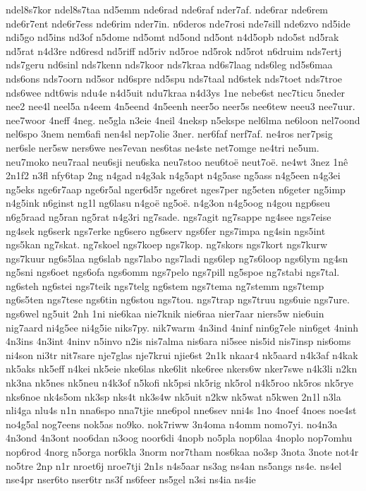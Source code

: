 {ndel8s7kor
ndel8s7taa
nd5emm
nde6rad
nde6raf
nder7af.
nde6rar
nde6rem
nde6r7ent
nde6r7ess
nde6rim
nder7in.
n6deros
nde7rosi
nde7sill
nde6zvo
nd5ide
ndi5go
nd5ins
nd3of
n5dome
nd5omt
nd5ond
nd5ont
n4d5opb
ndo5st
nd5rak
nd5rat
n4d3re
nd6resd
nd5riff
nd5riv
nd5roe
nd5rok
nd5rot
n6druim
nds7ertj
nds7geru
nd6sinl
nds7kenn
nds7koor
nds7kraa
nd6s7laag
nds6leg
nd5s6maa
nds6ons
nds7oorn
nd5sor
nd6spre
nd5spu
nds7taal
nd6stek
nds7toet
nds7troe
nds6wee
ndt6wis
ndu4e
n4d5uit
ndu7kraa
n4d3ys
1ne
nebe6st
nec7ticu
5neder
nee2
nee4l
neel5a
n4eem
4n5eend
4n5eenh
neer5o
neer5s
nee6tew
neeu3
nee7uur.
nee7woor
4neff
4neg.
ne5gla
n3eie
4neil
4neksp
n5ekspe
nel6lma
ne6loon
nel7oond
nel6spo
3nem
nem6afi
nen4sl
nep7olie
3ner.
ner6faf
nerf7af.
ne4ros
ner7psig
ner6sle
ner5sw
ners6we
nes7evan
nes6tas
ne4ste
net7omge
ne4tri
ne5um.
neu7moko
neu7raal
neu6sji
neu6ska
neu7stoo
neu6toë
neut7oë.
ne4wt
3nez
1nê
2n1f2
n3fl
nfy6tap
2ng
n4gad
n4g3ak
n4g5apt
n4g5ase
ng5ass
n4g5een
n4g3ei
ng5eks
nge6r7aap
nge6r5al
nger6d5r
nge6ret
nges7per
ng5eten
n6geter
ng5imp
n4g5ink
n6ginst
ng1l
ng6lasu
n4goë
ng5oë.
n4g3on
n4g5oog
n4gou
ngp6seu
n6g5raad
ng5ran
ng5rat
n4g3ri
ng7sade.
ngs7agit
ng7sappe
ng4see
ngs7eise
ng4sek
ng6serk
ngs7erke
ng6sero
ng6serv
ngs6fer
ngs7impa
ng4sin
ngs5int
ngs5kan
ng7skat.
ng7skoel
ngs7koep
ngs7kop.
ng7skors
ngs7kort
ngs7kurw
ngs7kuur
ng6s5laa
ng6slab
ngs7labo
ngs7ladi
ngs6lep
ng7s6loop
ngs6lym
ng4sn
ng5sni
ngs6oet
ngs6ofa
ngs6omm
ngs7pelo
ngs7pill
ng5spoe
ng7stabi
ngs7tal.
ng6steh
ng6stei
ngs7teik
ngs7telg
ng6stem
ngs7tema
ng7stemm
ngs7temp
ng6s5ten
ngs7tese
ngs6tin
ng6stou
ngs7tou.
ngs7trap
ngs7truu
ngs6uie
ngs7ure.
ngs6wel
ng5uit
2nh
1ni
nie6kaa
nie7knik
nie6raa
nier7aar
niers5w
nie6uin
nig7aard
ni4g5ee
ni4g5ie
niks7py.
nik7warm
4n3ind
4ninf
nin6g7ele
nin6get
4ninh
4n3ins
4n3int
4ninv
n5invo
n2is
nis7alma
nis6ara
ni5see
nis5id
nis7insp
nis6oms
ni4son
ni3tr
nit7sare
nje7glas
nje7krui
njie6st
2n1k
nkaar4
nk5aard
n4k3af
n4kak
nk5aks
nk5eff
n4kei
nk5eie
nke6las
nke6lit
nke6ree
nkers6w
nker7swe
n4k3li
n2kn
nk3na
nk5nes
nk5neu
n4k3of
n5kofi
nk5psi
nk5rig
nk5rol
n4k5roo
nk5ros
nk5rye
nks6noe
nk4s5om
nk3sp
nks4t
nk3s4w
nk5uit
n2kw
nk5wat
n5kwen
2n1l
n3la
nli4ga
nlu4s
n1n
nna6spo
nna7tjie
nne6pol
nne6sev
nni4s
1no
4noef
4noes
noe4st
no4g5al
nog7eens
nok5as
no9ko.
nok7riww
3n4oma
n4omm
nomo7yi.
no4n3a
4n3ond
4n3ont
noo6dan
n3oog
noor6di
4nopb
no5pla
nop6laa
4noplo
nop7omhu
nop6rod
4norg
n5orga
nor6kla
3norm
nor7tham
nos6kaa
no3sp
3nota
3note
not4r
no5tre
2np
n1r
nroet6j
nroe7tji
2n1s
n4s5aar
ns3ag
ns4an
ns5angs
ns4e.
ns4el
nse4pr
nser6to
nser6tr
ns3f
ns6feer
ns5gel
n3si
ns4ia
ns4ie
}
